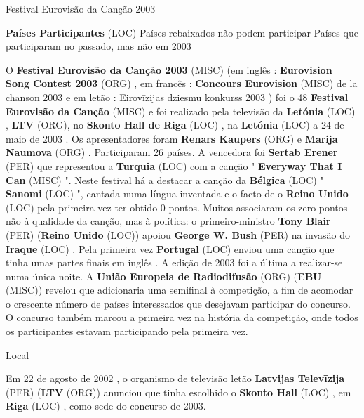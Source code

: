 \documentclass[12pt,a4paper]{article}
\begin{document}
Festival Eurovisão da Canção 2003



\textbf{Países Participantes} (LOC) Países rebaixados não podem participar Países que participaram no passado, mas não em 2003

O \textbf{Festival Eurovisão da Canção 2003} (MISC) (em inglês : \textbf{Eurovision Song Contest 2003} (ORG) , em francês : \textbf{Concours Eurovision} (MISC) de la chanson 2003 e em letão : Eirovīzijas dziesmu konkurss 2003 ) foi o 48 \textbf{Festival Eurovisão da Canção} (MISC) e foi realizado pela televisão da \textbf{Letónia} (LOC) , \textbf{LTV} (ORG), no \textbf{Skonto Hall de Riga} (LOC) , na \textbf{Letónia} (LOC) a 24 de maio de 2003 . Os apresentadores foram \textbf{Renars Kaupers} (ORG) e \textbf{Marija Naumova} (ORG) . Participaram 26 países. A vencedora foi \textbf{Sertab Erener} (PER) que representou a \textbf{Turquia} (LOC) com a canção " \textbf{Everyway That I Can} (MISC) ". Neste festival há a destacar a canção da \textbf{Bélgica} (LOC) " \textbf{Sanomi} (LOC) ", cantada numa língua inventada e o facto de o \textbf{Reino Unido} (LOC) pela primeira vez ter obtido 0 pontos. Muitos associaram os zero pontos não à qualidade da canção, mas à política: o primeiro-ministro \textbf{Tony Blair} (PER) (\textbf{Reino Unido} (LOC)) apoiou \textbf{George W. Bush} (PER) na invasão do \textbf{Iraque} (LOC) . Pela primeira vez \textbf{Portugal} (LOC) enviou uma canção que tinha umas partes finais em inglês . A edição de 2003 foi a última a realizar-se numa única noite. A \textbf{União Europeia de Radiodifusão} (ORG) (\textbf{EBU} (MISC)) revelou que adicionaria uma semifinal à competição, a fim de acomodar o crescente número de países interessados que desejavam participar do concurso. O concurso também marcou a primeira vez na história da competição, onde todos os participantes estavam participando pela primeira vez.



Local

Em 22 de agosto de 2002 , o organismo de televisão letão \textbf{Latvijas Televīzija} (PER) (\textbf{LTV} (ORG)) anunciou que tinha escolhido o \textbf{Skonto Hall} (LOC) , em \textbf{Riga} (LOC) , como sede do concurso de 2003.
\end{document}
